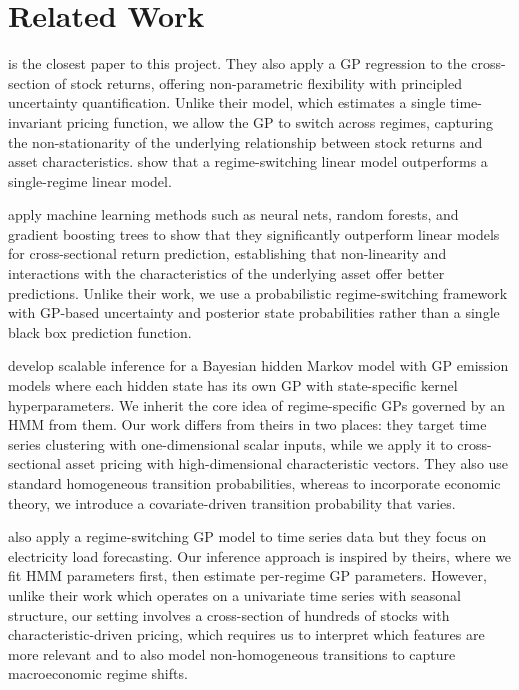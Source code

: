 \documentclass[11pt]{article}
\begin{document}
\section{Related Work}
\cite{filipovic_empirical_2025} is the closest paper to this project. They also apply a GP regression to the cross-section of stock returns, offering non-parametric flexibility with principled uncertainty quantification. Unlike their model, which estimates a single time-invariant pricing function, we allow the GP to switch across regimes, capturing the non-stationarity of the underlying relationship between stock returns and asset characteristics. \cite{guidolin_size_2008} show that a regime-switching linear model outperforms a single-regime linear model.

\cite{gu_empirical_2020} apply machine learning methods such as neural nets, random forests, and gradient boosting trees to show that they significantly outperform linear models for cross-sectional return prediction, establishing that non-linearity and interactions with the characteristics of the underlying asset offer better predictions. Unlike their work, we use a probabilistic regime-switching framework with GP-based uncertainty and posterior state probabilities rather than a single black box prediction function. 

\cite{jung_scalable_2022} develop scalable inference for a Bayesian hidden Markov model with GP emission models where each hidden state has its own GP with state-specific kernel hyperparameters. We inherit the core idea of regime-specific GPs governed by an HMM from them. Our work differs from theirs in two places: they target time series clustering with one-dimensional scalar inputs, while we apply it to cross-sectional asset pricing with high-dimensional characteristic vectors. They also use standard homogeneous transition probabilities, whereas to incorporate economic theory, we introduce a covariate-driven transition probability that varies.

\cite{li_hidden_2023} also apply a regime-switching GP model to time series data but they focus on electricity load forecasting. Our inference approach is inspired by theirs, where we fit HMM parameters first, then estimate per-regime GP parameters. However, unlike their work which operates on a univariate time series with seasonal structure, our setting involves a cross-section of hundreds of stocks with characteristic-driven pricing, which requires us to interpret which features are more relevant and to also model non-homogeneous transitions to capture macroeconomic regime shifts. 
\end{document}
